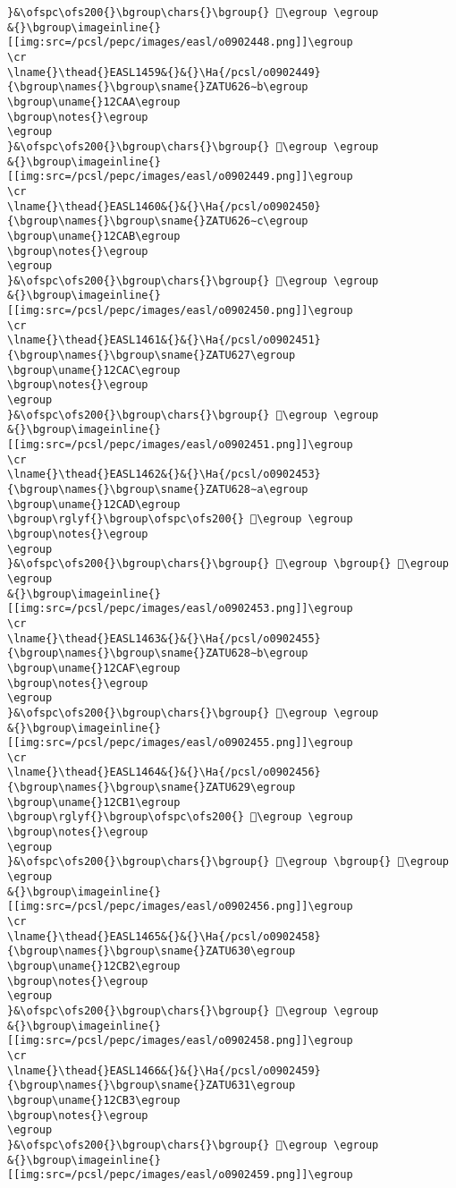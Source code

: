 \begin{verbatim}
}&\ofspc\ofs200{}\bgroup\chars{}\bgroup{} 𒲩\egroup \egroup
&{}\bgroup\imageinline{}[[img:src=/pcsl/pepc/images/easl/o0902448.png]]\egroup
\cr
\lname{}\thead{}EASL1459&{}&{}\Ha{/pcsl/o0902449}{\bgroup\names{}\bgroup\sname{}ZATU626∼b\egroup
\bgroup\uname{}12CAA\egroup
\bgroup\notes{}\egroup
\egroup
}&\ofspc\ofs200{}\bgroup\chars{}\bgroup{} 𒲪\egroup \egroup
&{}\bgroup\imageinline{}[[img:src=/pcsl/pepc/images/easl/o0902449.png]]\egroup
\cr
\lname{}\thead{}EASL1460&{}&{}\Ha{/pcsl/o0902450}{\bgroup\names{}\bgroup\sname{}ZATU626∼c\egroup
\bgroup\uname{}12CAB\egroup
\bgroup\notes{}\egroup
\egroup
}&\ofspc\ofs200{}\bgroup\chars{}\bgroup{} 𒲫\egroup \egroup
&{}\bgroup\imageinline{}[[img:src=/pcsl/pepc/images/easl/o0902450.png]]\egroup
\cr
\lname{}\thead{}EASL1461&{}&{}\Ha{/pcsl/o0902451}{\bgroup\names{}\bgroup\sname{}ZATU627\egroup
\bgroup\uname{}12CAC\egroup
\bgroup\notes{}\egroup
\egroup
}&\ofspc\ofs200{}\bgroup\chars{}\bgroup{} 𒲬\egroup \egroup
&{}\bgroup\imageinline{}[[img:src=/pcsl/pepc/images/easl/o0902451.png]]\egroup
\cr
\lname{}\thead{}EASL1462&{}&{}\Ha{/pcsl/o0902453}{\bgroup\names{}\bgroup\sname{}ZATU628∼a\egroup
\bgroup\uname{}12CAD\egroup
\bgroup\rglyf{}\bgroup\ofspc\ofs200{} 𒲭\egroup \egroup
\bgroup\notes{}\egroup
\egroup
}&\ofspc\ofs200{}\bgroup\chars{}\bgroup{} 𒲭\egroup \bgroup{} 𒲮\egroup \egroup
&{}\bgroup\imageinline{}[[img:src=/pcsl/pepc/images/easl/o0902453.png]]\egroup
\cr
\lname{}\thead{}EASL1463&{}&{}\Ha{/pcsl/o0902455}{\bgroup\names{}\bgroup\sname{}ZATU628∼b\egroup
\bgroup\uname{}12CAF\egroup
\bgroup\notes{}\egroup
\egroup
}&\ofspc\ofs200{}\bgroup\chars{}\bgroup{} 𒲯\egroup \egroup
&{}\bgroup\imageinline{}[[img:src=/pcsl/pepc/images/easl/o0902455.png]]\egroup
\cr
\lname{}\thead{}EASL1464&{}&{}\Ha{/pcsl/o0902456}{\bgroup\names{}\bgroup\sname{}ZATU629\egroup
\bgroup\uname{}12CB1\egroup
\bgroup\rglyf{}\bgroup\ofspc\ofs200{} 𒲱\egroup \egroup
\bgroup\notes{}\egroup
\egroup
}&\ofspc\ofs200{}\bgroup\chars{}\bgroup{} 𒲰\egroup \bgroup{} 𒲱\egroup \egroup
&{}\bgroup\imageinline{}[[img:src=/pcsl/pepc/images/easl/o0902456.png]]\egroup
\cr
\lname{}\thead{}EASL1465&{}&{}\Ha{/pcsl/o0902458}{\bgroup\names{}\bgroup\sname{}ZATU630\egroup
\bgroup\uname{}12CB2\egroup
\bgroup\notes{}\egroup
\egroup
}&\ofspc\ofs200{}\bgroup\chars{}\bgroup{} 𒲲\egroup \egroup
&{}\bgroup\imageinline{}[[img:src=/pcsl/pepc/images/easl/o0902458.png]]\egroup
\cr
\lname{}\thead{}EASL1466&{}&{}\Ha{/pcsl/o0902459}{\bgroup\names{}\bgroup\sname{}ZATU631\egroup
\bgroup\uname{}12CB3\egroup
\bgroup\notes{}\egroup
\egroup
}&\ofspc\ofs200{}\bgroup\chars{}\bgroup{} 𒲳\egroup \egroup
&{}\bgroup\imageinline{}[[img:src=/pcsl/pepc/images/easl/o0902459.png]]\egroup

\end{verbatim}
